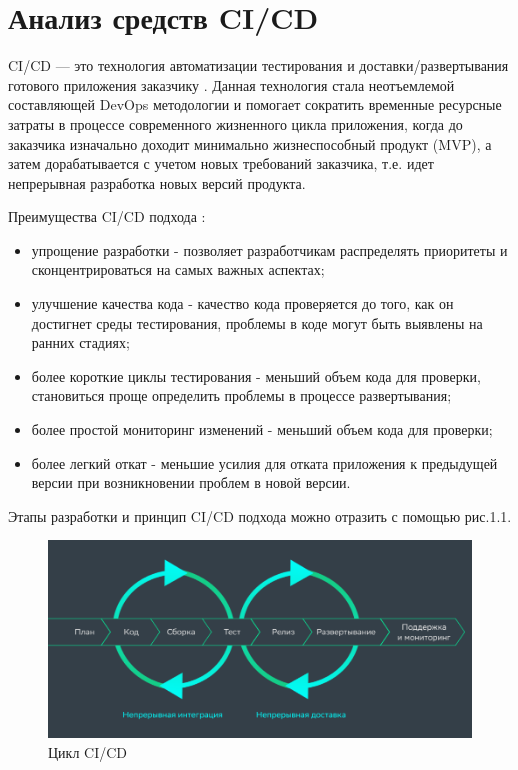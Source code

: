 \section{Анализ средств CI/CD} \label{ch1:sec3}


CI/CD — это технология автоматизации тестирования и доставки/развертывания готового приложения заказчику  \cite{cicd}. Данная технология стала неотъемлемой составляющей DevOps методологии и помогает сократить временные  ресурсные затраты в процессе современного жизненного цикла приложения, когда до заказчика изначально доходит минимально жизнеспособный продукт (MVP), а затем дорабатывается с учетом новых требований заказчика, т.е. идет непрерывная разработка новых версий продукта.

Преимущества CI/CD подхода \cite{plusci}:

\begin{itemize}
	\item упрощение разработки - позволяет разработчикам распределять приоритеты и сконцентрироваться на самых важных аспектах;
	\item улучшение качества кода -  качество кода проверяется до того, как он достигнет среды тестирования, проблемы в коде могут быть выявлены на ранних стадиях;
	\item более короткие циклы тестирования - меньший объем кода для проверки, становиться проще определить проблемы в процессе развертывания;
	\item более простой мониторинг изменений - меньший объем кода для проверки;
	\item более легкий откат - меньшие усилия для отката приложения к предыдущей версии при возникновении проблем в новой версии.
\end{itemize}

Этапы разработки и принцип CI/CD подхода можно отразить с помощью рис.1.1.

\begin{figure}[ht!] 
	\center
	\includegraphics [scale=0.67] {my_folder/images//cicdalter}
	\caption{Цикл CI/CD \cite{cycleci}} 
	\label{fig:ci-cd}  
\end{figure}



